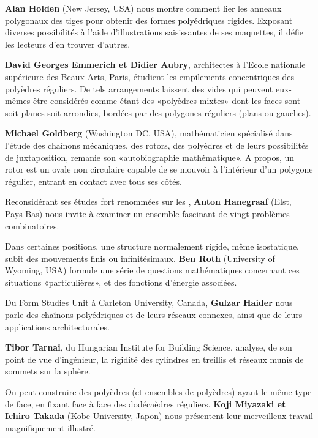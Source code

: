 \begin{minipage}[t]{.50\linewidth}
\textbf{Alan Holden} (New Jersey, USA) nous montre comment lier les anneaux polygonaux des tiges pour obtenir des formes polyédriques rigides. Exposant diverses possibilités à l'aide d'illustrations saisissantes de ses maquettes, il défie les lecteurs d'en trouver d'autres.

\textbf{David Georges Emmerich et Didier Aubry}, architectes à l'Ecole nationale supérieure des Beaux-Arts, Paris, étudient les empilements concentriques des polyèdres réguliers. De tels arrangements laissent des vides qui peuvent eux-mêmes être considérés comme étant des «polyèdres mixtes» dont les faces sont soit planes soit arrondies, bordées par des polygones réguliers (plans ou gauches).

\textbf{Michael Goldberg} (Washington DC, USA), mathématicien spécialisé dans l'étude des chaînons mécaniques, des rotors, des polyèdres et de leurs possibilités de juxtaposition, remanie son «autobiographie mathématique». A propos, un rotor est un ovale non circulaire capable de se mouvoir à l'intérieur d'un polygone régulier, entrant en contact avec tous ses côtés.

Reconsidérant ses études fort renommées sur les , \textbf{Anton Hanegraaf} (Elst, Pays-Bas) nous invite à examiner un ensemble fascinant de vingt problèmes combinatoires.

Dans certaines positions, une structure normalement rigide, même isostatique, subit des mouvements finis ou infinitésimaux. \textbf{Ben Roth} (University of Wyoming, USA) formule une série de questions mathématiques concernant ces situations «particulières», et des fonctions d'énergie associées.

Du Form Studies Unit à Carleton University, Canada, \textbf{Gulzar Haider} nous parle des chaînons polyédriques et de leurs réseaux connexes, ainsi que de leurs applications architecturales.

\textbf{Tibor Tarnai}, du Hungarian Institute for Building Science, analyse, de son point de vue d'ingénieur, la rigidité des cylindres en treillis et réseaux munis de sommets sur la sphère.

On peut construire des polyèdres (et ensembles de polyèdres) ayant le même type de face, en fixant face à face des dodécaèdres réguliers. \textbf{Koji Miyazaki et Ichiro Takada} (Kobe University, Japon) nous présentent leur merveilleux travail magnifiquement illustré.
\end{minipage}\hfill
